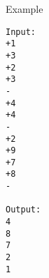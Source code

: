 Example
\begin{verbatim}
Input:
+1
+3
+2
+3
-
+4
+4
-
+2
+9
+7
+8
-

Output:
4
8 
7 
2 
1 

\end{verbatim}